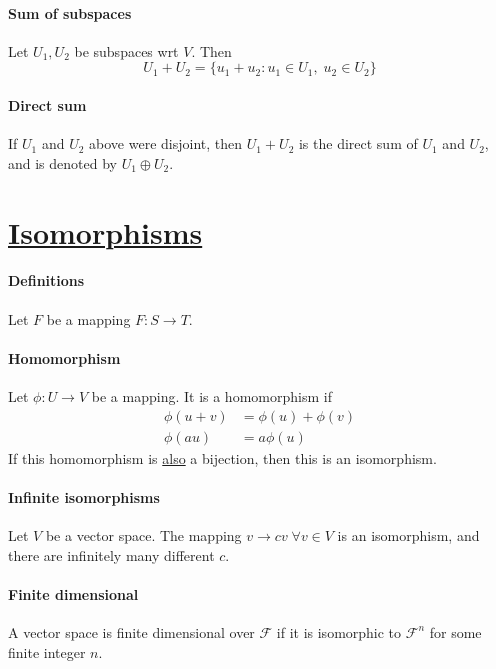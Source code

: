 \documentclass[a4paper]{article}
\begin{document}
\begin{multicols*}{4}
    \paragraph{Sum of subspaces} Let $U_1, U_2$ be subspaces wrt $V$. Then
      \[ U_1+U_2 = \{ u_1+u_2: u_1 \in U_1, \; u_2 \in U_2\} \]
    \paragraph{Direct sum} If $U_1$ and $U_2$ above were disjoint, then $U_1 + U_2$ is the direct sum of $U_1$ and $U_2$, and is denoted by $U_1 \oplus U_2$.
  \section*{\underline{Isomorphisms}}
    \paragraph{Definitions} Let $F$ be a mapping $F:S \rightarrow T$.
    \paragraph{Homomorphism} Let $\phi:U \rightarrow V$ be a mapping. It is a homomorphism if
      \begin{align*}
        \phi(u+v) &= \phi(u) + \phi(v) \\
        \phi(au) &= a \phi(u)
      \end{align*}
      If this homomorphism is \underline{also} a bijection, then this is an isomorphism.
    \paragraph{Infinite isomorphisms} Let $V$ be a vector space. The mapping $v \rightarrow cv \; \forall v \in V$ is an isomorphism, and there are infinitely many different $c$.
    \paragraph{Finite dimensional} A vector space is finite dimensional over $\mathcal{F}$ if it is isomorphic to $\mathcal{F}^n$ for some finite integer $n$.

\end{multicols*}
\end{document}
